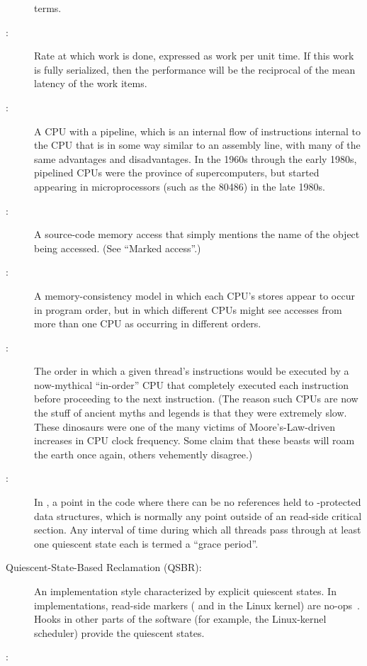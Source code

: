 \begin{description}
	terms.
\item[\IXG{Performance}:]
	Rate at which work is done, expressed as work per unit time.
	If this work is fully serialized, then the performance will
	be the reciprocal of the mean latency of the work items.
\item[\IXGr{Pipelined CPU}:]
	A CPU with a pipeline, which is
	an internal flow of instructions internal to the CPU that
	is in some way similar to an assembly line, with many of
	the same advantages and disadvantages.
	In the 1960s through the early 1980s, pipelined CPUs were the
	province of supercomputers, but started appearing in microprocessors
	(such as the 80486) in the late 1980s.
\item[\IXG{Plain Access}:]
	A source-code memory access that simply mentions the name of
	the object being accessed.
	(See ``Marked access''.)
\item[\IXGh{Process}{Consistency}:]
	A memory-consistency model in which each CPU's stores appear to
	occur in program order, but in which different CPUs might see
	accesses from more than one CPU as occurring in different orders.
\item[\IXG{Program Order}:]
	The order in which a given thread's instructions
	would be executed by a now-mythical ``in-order'' CPU that
	completely executed each instruction before proceeding to
	the next instruction.
	(The reason such CPUs are now the stuff of ancient myths
	and legends is that they were extremely slow.
	These dinosaurs were one of the many victims of
	Moore's-Law-driven increases in CPU clock frequency.
	Some claim that these beasts will roam the earth once again,
	others vehemently disagree.)
\item[\IXG{Quiescent State}:]
	In , a point in the code where there can be no references held
	to -protected data structures, which is normally any point
	outside of an  read-side critical section.
	Any interval of time during which all threads pass through at
	least one quiescent state each is termed a ``grace period''.
\item[Quiescent-State-Based Reclamation (QSBR):]
	An  implementation style characterized by explicit quiescent
	states.
	In  implementations, read-side markers
	( and  in the Linux
	kernel) are no-ops~\cite{McKenney98,Slingwine95}.
	Hooks in other parts of the software (for example, the Linux-kernel
	scheduler) provide the quiescent states.
\item[\IXG{Race Condition}:]

\end{description}
